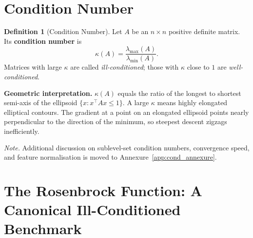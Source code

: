 \documentclass[11pt]{article}
\theoremstyle{definition}
\newtheorem{definition}{Definition}
\theoremstyle{plain}
\begin{document}
\section{Condition Number}

\begin{definition}[Condition Number]\label{def:cond}
Let $A$ be an $n\times n$ positive definite matrix. Its \textbf{condition number} is
\[
  \kappa(A) = \frac{\lambda_{\max}(A)}{\lambda_{\min}(A)}.
\]
Matrices with large $\kappa$ are called \emph{ill-conditioned};
those with $\kappa$ close to $1$ are \emph{well-conditioned}.
\end{definition}

\noindent\textbf{Geometric interpretation.}
$\kappa(A)$ equals the ratio of the longest to shortest semi-axis of
the ellipsoid $\{x : x^\top Ax \leq 1\}$. A large $\kappa$ means highly
elongated elliptical contours. The gradient at a point on an elongated
ellipsoid points nearly perpendicular to the direction of the minimum,
so steepest descent zigzags inefficiently.

\medskip
\noindent\textit{Note.} Additional discussion on sublevel-set condition numbers,
convergence speed, and feature normalisation is moved to
Annexure~\ref{app:cond_annexure}.

\section{The Rosenbrock Function: A Canonical Ill-Conditioned Benchmark}
\end{document}
